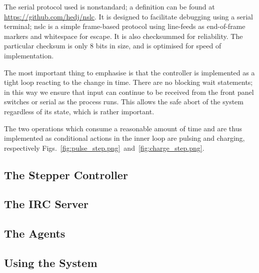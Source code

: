 The serial protocol used is nonstandard; a definition can be found at \url{https://github.com/hedj/nslc}.  It is designed to facilitate debugging using a serial terminal; nslc is a simple frame-based protocol using line-feeds as end-of-frame markers and whitespace for escape. It is also checksummed for reliability. The particular checksum is only 8 bits in size, and is optimised for speed of implementation.

The most important thing to emphasise is that the controller is implemented as a tight loop reacting to the change in time. There are no blocking wait statements; in this way we ensure that input can continue to be received from the front panel switches or serial as the process runs. This allows the safe abort of the system regardless of its state, which is rather important.

The two operations which consume a reasonable amount of time and are thus implemented as conditional actions in the inner loop are pulsing and charging, respectively Figs.~\ref{fig:pulse_step.png}~and~\ref{fig:charge_step.png}.




\subsection{The Stepper Controller}
\subsection{The IRC Server}
\subsection{The Agents}
\subsection{Using the System}
